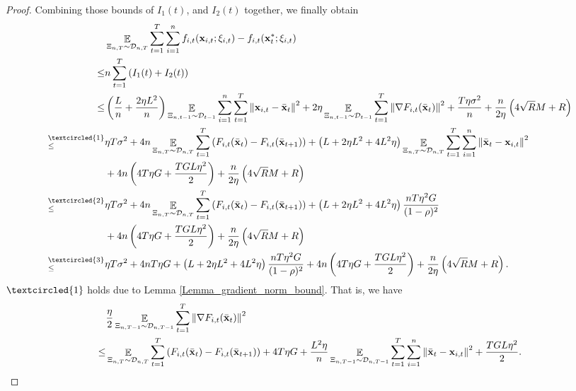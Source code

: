 \documentclass{article}
\begin{document}
\begin{proof}
 
Combining those bounds of $I_1(t)$, and $I_2(t)$ together, we finally obtain
\begin{align}
\nonumber
& \EE_{ \Xi_{n,T} \sim \Dcal_{n,T} } \sum_{t=1}^T\sum_{i=1}^n f_{i,t}(\x_{i,t};\xi_{i,t}) - f_{i,t}(\x_t^\ast;\xi_{i,t}) \\ \nonumber
\le & n \sum_{t=1}^T \lrincir{ I_1(t) + I_2(t) } \\ \nonumber
\le & \lrincir{ \frac{L}{n} + \frac{2\eta L^2}{n} }\EE_{ \Xi_{n,t-1} \sim \Dcal_{t-1} }\sum_{i=1}^n\sum_{t=1}^T\lrnorm{\x_{i,t} - \bar{\x}_t }^2   + 2\eta  \EE_{ \Xi_{n,t-1} \sim \Dcal_{t-1} }\sum_{t=1}^T\lrnorm{\nabla F_{i,t}(\bar{\x}_t)}^2 + \frac{T\eta  \sigma^2}{n}   + \frac{n}{2\eta}\lrincir{ 4\sqrt{R}M + R  } \\ \nonumber
\refabovecir{\le}{\textcircled{1}} & \eta T \sigma^2 + 4n \EE_{ \Xi_{n,T} \sim \Dcal_{n,T} } \sum_{t=1}^T  \lrincir{F_{i,t}(\bar{\x}_t) - F_{i,t}(\bar{\x}_{t+1})}  +  \lrincir{L + 2\eta L^2  + 4L^2 \eta}  \EE_{ \Xi_{n,T} \sim \Dcal_{n,T} }\sum_{t=1}^T\sum_{i=1}^n \lrnorm{ \bar{\x}_t - \x_{i,t} }^2  \\ \nonumber
& + 4n \lrincir{ 4T  \eta G + \frac{TGL\eta^2}{2} }  + \frac{n}{2\eta}\lrincir{ 4\sqrt{R}M + R  }\\ \nonumber
\refabovecir{\le}{\textcircled{2}} & \eta T \sigma^2 + 4n \EE_{ \Xi_{n,T} \sim \Dcal_{n,T} } \sum_{t=1}^T  \lrincir{F_{i,t}(\bar{\x}_t) - F_{i,t}(\bar{\x}_{t+1})}  +  \lrincir{ L + 2\eta L^2  + 4L^2 \eta}  \frac{nT\eta^2 G }{(1-\rho)^2}  \\ \nonumber
& + 4n \lrincir{ 4T  \eta G + \frac{TGL\eta^2}{2} }  + \frac{n}{2\eta}\lrincir{ 4\sqrt{R}M + R  } \\ \nonumber
\refabovecir{\le}{\textcircled{3}} & \eta T \sigma^2 + 4n  T\eta G  + \lrincir{ L + 2\eta L^2  + 4L^2 \eta}  \frac{nT\eta^2 G }{(1-\rho)^2}  + 4n\lrincir{ 4T  \eta G + \frac{TGL\eta^2}{2} }  + \frac{n}{2\eta}\lrincir{ 4\sqrt{R}M + R  }.
\end{align}  
$\textcircled{1}$ holds due to Lemma \ref{Lemma_gradient_norm_bound}. That is, we have
\begin{align}
\nonumber
& \frac{\eta}{2} \EE_{ \Xi_{n,T-1} \sim \Dcal_{n,T-1} }\sum_{t=1}^T \lrnorm{\nabla F_{i,t}(\bar{\x}_t)}^2 \\ \nonumber
\le & \EE_{ \Xi_{n,T} \sim \Dcal_{n,T} } \sum_{t=1}^T  \lrincir{F_{i,t}(\bar{\x}_t) - F_{i,t}(\bar{\x}_{t+1})} + 4T  \eta G + \frac{ L^2 \eta}{n}\EE_{ \Xi_{n,T-1} \sim \Dcal_{n,T-1} }\sum_{t=1}^T\sum_{i=1}^n \lrnorm{ \bar{\x}_t - \x_{i,t} }^2 + \frac{TGL\eta^2}{2}.

\end{align}
\end{proof}
\end{document}
